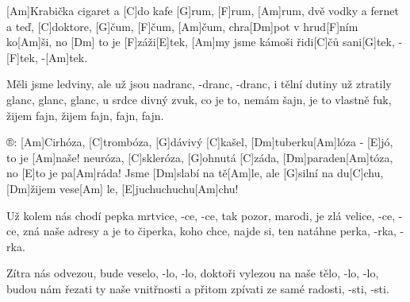 
[Am]Krabička cigaret a [C]do kafe [G]rum, [F]rum, [Am]rum,
dvě vodky a fernet a teď, [C]doktore, [G]\null čum, [F]\null čum, [Am]\null čum,
chra[Dm]pot v hrud[F]ním ko[Am]\null ši, no [Dm] to je [F]záži[E]tek,
[Am]my jsme kámoši řidi[C]\null čů sani[G]tek, -[F]tek, -[Am]tek.

Měli jsme ledviny, ale už jsou nadranc, -dranc, -dranc,
i tělní dutiny už ztratily glanc, glanc, glanc,
u srdce divný zvuk, co je to, nemám šajn,
je to vlastně fuk, žijem fajn, žijem fajn, fajn, fajn.

®: [Am]Cirhóza, [C]trombóza, [G]dávivý [C]kašel,
[Dm]tuberku[Am]lóza - [E]jó, to je [Am]naše!
neuróza, [C]skleróza, [G]ohnutá [C]záda,
[Dm]paraden[Am]tóza, no [E]to je pa[Am]ráda!
Jsme [Dm]slabí na tě[Am]le, ale [G]silní na du[C]chu,
[Dm]\null žijem vese[Am] le, [E]juchuchuchu[Am]chu!

Už kolem nás chodí pepka mrtvice, -ce, -ce,
tak pozor, marodi, je zlá velice, -ce, -ce,
zná naše adresy a je to čiperka,
koho chce, najde si, ten natáhne perka, -rka, -rka.

Zítra nás odvezou, bude veselo, -lo, -lo,
doktoři vylezou na naše tělo, -lo, -lo,
budou nám řezati ty naše vnitřnosti
a přitom zpívati ze samé radosti, -sti, -sti.